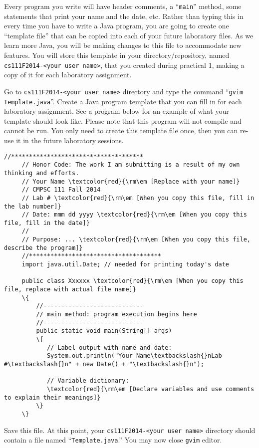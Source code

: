Every program you write will have header comments, a ``{\tt main}'' method, some statements that print your name and the
date, etc. Rather than typing this in every time you have to write a Java program, you are going to create one
``template file'' that can be copied into each of your future laboratory files. As we learn more Java, you will be
making changes to this file to accommodate new features. You will store this template in your directory/repository,
named {\tt cs111F2014-<your user name>}, that you created during practical 1, making a copy of it for each laboratory
assignment.

\noindent Go to {\tt cs111F2014-<your user name>} directory and type the command ``{\tt gvim Template.java}''.
Create a Java program template that you can fill in for each laboratory assignment. 
See a program below for an example of what your template should look like.
Please note that this program will not compile and cannot be run.
You only need to create this template file once, then you can re-use it
in the future laboratory sessions.

\begin{Verbatim}[commandchars=\\\{\}]
     //*************************************
     // Honor Code: The work I am submitting is a result of my own thinking and efforts.
     // Your Name \textcolor{red}{\rm\em [Replace with your name]}
     // CMPSC 111 Fall 2014
     // Lab # \textcolor{red}{\rm\em [When you copy this file, fill in the lab number]}
     // Date: mmm dd yyyy \textcolor{red}{\rm\em [When you copy this file, fill in the date]}
     //
     // Purpose: ... \textcolor{red}{\rm\em [When you copy this file, describe the program]}
     //*************************************     
     import java.util.Date; // needed for printing today's date
     
     public class Xxxxxx \textcolor{red}{\rm\em [When you copy this file, replace with actual file name]}
     \{
         //----------------------------
         // main method: program execution begins here
         //----------------------------
         public static void main(String[] args)
         \{
            // Label output with name and date:
            System.out.println("Your Name\textbackslash{}nLab #\textbackslash{}n" + new Date() + "\textbackslash{}n");
     
            // Variable dictionary:
            \textcolor{red}{\rm\em [Declare variables and use comments to explain their meanings]}    
         \}
     \}
\end{Verbatim}
\noindent Save this file. At this point, your {\tt cs111F2014-<your user name>} directory should contain a file named
``{\tt Template.java}.'' You may now close {\tt gvim} editor.



